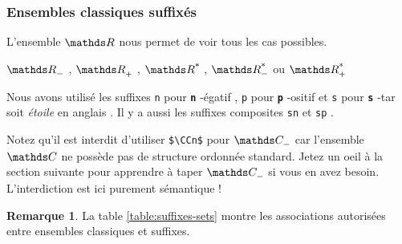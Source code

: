 \documentclass[12pt,a4paper]{article}
\theoremstyle{definition}
\newtheorem*{remark}{Remarque}
\newcommand\whyprefix[2]{%
	\textbf{\prefix{#1}}-#2%
}
\newcommand\prefix[1]{%
	\texttt{#1}%
}
\newcommand\inenglish[1]{%
	\emph{\og #1 \fg} en anglais%
}
\begin{document}


\subsubsection{Ensembles classiques suffixés}

L'ensemble $\RR$ nous permet de voir tous les cas possibles. 

\begin{latexex}
$\RRn$ ,
$\RRp$ ,
$\RRs$ ,
$\RRsn$ ou
$\RRsp$
\end{latexex}


Nous avons utilisé les suffixes \prefix{n} pour \whyprefix{n}{égatif}, \prefix{p} pour \whyprefix{p}{ositif} et \prefix{s} pour \whyprefix{s}{tar} soit \inenglish{étoile}. Il y a aussi les suffixes composites \prefix{sn} et \prefix{sp}.

\medskip

Notez qu'il est interdit d'utiliser \verb+$\CCn$+ pour $\setspecial{\CC}{n}$ car l'ensemble $\CC$ ne possède pas de structure ordonnée standard. Jetez un oeil à la section suivante pour apprendre à taper $\setspecial{\CC}{n}$ si vous en avez besoin. L'interdiction est ici purement sémantique !

\medskip

\begin{remark}
	La table \ref{table:suffixes-sets}  montre les associations autorisées entre ensembles classiques et suffixes.
\end{remark}

\end{document}
